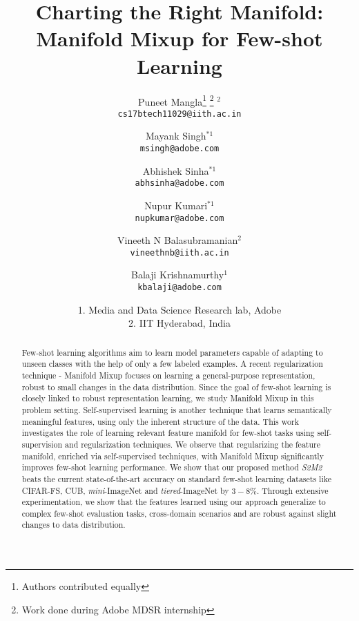 \documentclass[10pt,twocolumn,letterpaper]{article}
\begin{document}
\title{Charting the Right Manifold: Manifold Mixup for Few-shot Learning
}

\author{Puneet Mangla\thanks{Authors contributed equally   }   \thanks{Work done during Adobe MDSR internship }  $^{2}$ \\
{\tt\small cs17btech11029@iith.ac.in}
\and
Mayank Singh$^{*1}$ \\
{\tt\small msingh@adobe.com}
\and
Abhishek Sinha$^{*1}$ \\
{\tt\small abhsinha@adobe.com}
\and
Nupur Kumari$^{*1}$ \\
{\tt\small nupkumar@adobe.com}
\and
Vineeth N Balasubramanian$^{2}$ \\
{\tt\small vineethnb@iith.ac.in}
\and
Balaji Krishnamurthy$^{1}$ \\
{\tt\small kbalaji@adobe.com}\\
\and
1. Media and Data Science Research lab, Adobe\\
2. IIT Hyderabad, India
}


\maketitle
\ifwacvfinal\thispagestyle{empty}\fi

\begin{abstract}

Few-shot learning algorithms aim to learn model parameters capable of adapting to unseen classes with the help of only a few labeled examples. A recent regularization technique - Manifold Mixup focuses on learning a general-purpose representation, robust to small changes in the data distribution. Since the goal of few-shot learning is closely linked to robust representation learning, we study Manifold Mixup in this problem setting. Self-supervised learning is another technique that learns semantically meaningful features, using only the inherent structure of the data. This work investigates the role of learning relevant feature manifold for few-shot tasks using self-supervision and regularization techniques. We observe that regularizing the feature manifold, enriched via self-supervised techniques, with Manifold Mixup significantly improves few-shot learning performance.  
We show that our proposed method \textit{S2M2} beats the current state-of-the-art accuracy on standard few-shot learning datasets like CIFAR-FS, CUB, \textit{mini}-ImageNet and {\textit{tiered}-ImageNet} by $3-8\%$. Through extensive experimentation, we show that the features learned using our approach generalize to complex few-shot evaluation tasks, cross-domain scenarios and are robust against slight changes to data distribution.
\end{abstract}
\end{document}
